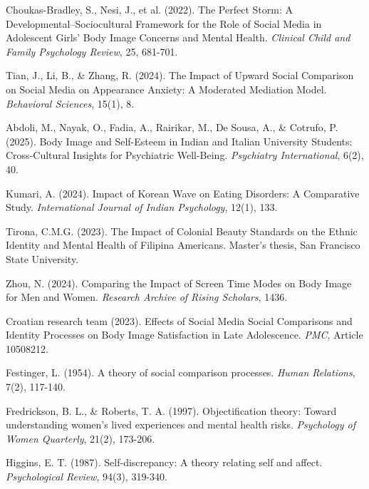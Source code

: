 \documentclass{article}
\begin{document}

\begin{thebibliography}{20}

Choukas-Bradley, S., Nesi, J., et al. (2022).
The Perfect Storm: A Developmental–Sociocultural Framework for the Role of Social Media in Adolescent Girls' Body Image Concerns and Mental Health.
\emph{Clinical Child and Family Psychology Review}, 25, 681-701.

Tian, J., Li, B., \& Zhang, R. (2024).
The Impact of Upward Social Comparison on Social Media on Appearance Anxiety: A Moderated Mediation Model.
\emph{Behavioral Sciences}, 15(1), 8.

Abdoli, M., Nayak, O., Fadia, A., Rairikar, M., De Sousa, A., \& Cotrufo, P. (2025).
Body Image and Self-Esteem in Indian and Italian University Students: Cross-Cultural Insights for Psychiatric Well-Being.
\emph{Psychiatry International}, 6(2), 40.

Kumari, A. (2024).
Impact of Korean Wave on Eating Disorders: A Comparative Study.
\emph{International Journal of Indian Psychology}, 12(1), 133.

Tirona, C.M.G. (2023).
The Impact of Colonial Beauty Standards on the Ethnic Identity and Mental Health of Filipina Americans.
Master's thesis, San Francisco State University.

Zhou, N. (2024).
Comparing the Impact of Screen Time Modes on Body Image for Men and Women.
\emph{Research Archive of Rising Scholars}, 1436.

Croatian research team (2023).
Effects of Social Media Social Comparisons and Identity Processes on Body Image Satisfaction in Late Adolescence.
\emph{PMC}, Article 10508212.

Festinger, L. (1954).
A theory of social comparison processes.
\emph{Human Relations}, 7(2), 117-140.

Fredrickson, B. L., \& Roberts, T. A. (1997).
Objectification theory: Toward understanding women's lived experiences and mental health risks.
\emph{Psychology of Women Quarterly}, 21(2), 173-206.

Higgins, E. T. (1987).
Self-discrepancy: A theory relating self and affect.
\emph{Psychological Review}, 94(3), 319-340.

\end{thebibliography}
\end{document}
